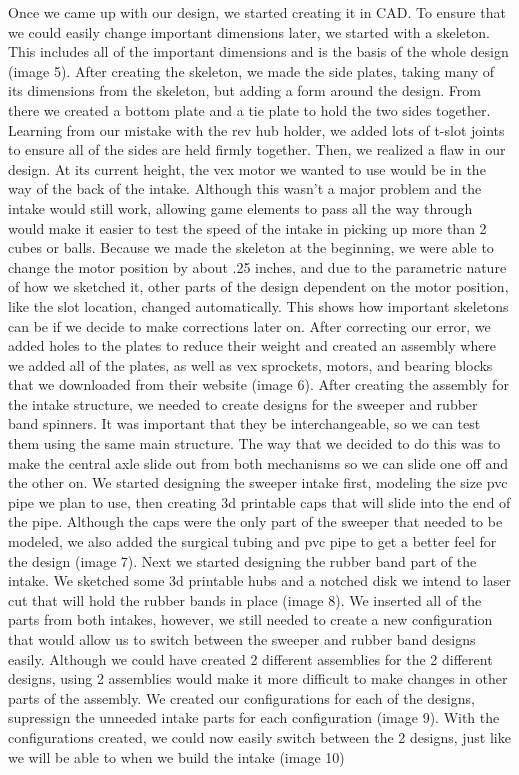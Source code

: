 Once we came up with our design, we started creating it in CAD. To ensure that we could easily change important dimensions later, we started with a skeleton. This includes all of the important dimensions and is the basis of the whole design (image 5). After creating the skeleton, we made the side plates, taking many of its dimensions from the skeleton, but adding a form around the design. From there we created a bottom plate and a tie plate to hold the two sides together. Learning from our mistake with the rev hub holder, we added lots of t-slot joints to ensure all of the sides are held firmly together. Then, we realized a flaw in our design. At its current height, the vex motor we wanted to use would be in the way of the back of the intake. Although this wasn’t a major problem and the intake would still work, allowing game elements to pass all the way through would make it easier to test the speed of the intake in picking up more than 2 cubes or balls. Because we made the skeleton at the beginning, we were able to change the motor position by about .25 inches, and due to the parametric nature of how we sketched it, other parts of the design dependent on the motor position, like the slot location, changed automatically. This shows how important skeletons can be if we decide to make corrections later on. After correcting our error, we added holes to the plates to reduce their weight and created an assembly where we added all of the plates, as well as vex sprockets, motors, and bearing blocks that we downloaded from their website (image 6).
After creating the assembly for the intake structure, we needed to create designs for the sweeper and rubber band spinners. It was important that they be interchangeable, so we can test them using the same main structure. The way that we decided to do this was to make the central axle slide out from both mechanisms so we can slide one off and the other on. We started designing the sweeper intake first, modeling the size pvc pipe we plan to use, then creating 3d printable caps that will slide into the end of the pipe. Although the caps were the only part of the sweeper that needed to be modeled, we also added the surgical tubing and pvc pipe to get a better feel for the design (image 7). Next we started designing the rubber band part of the intake. We sketched some 3d printable hubs and a notched disk we intend to laser cut that will hold the rubber bands in place (image 8). 
We inserted all of the parts from both intakes, however, we still needed to create a new configuration that would allow us to switch between the sweeper and rubber band designs easily. Although we could have created 2 different assemblies for the 2 different designs, using 2 assemblies would make it more difficult to make changes in other parts of the assembly. We created our configurations for each of the designs, supressign the unneeded intake parts for each configuration (image 9). With the configurations created, we could now easily switch between the 2 designs, just like we will be able to when we build the intake (image 10)

